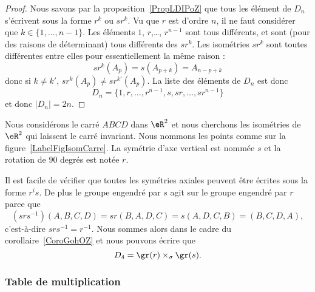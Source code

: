 \begin{proof}
    Nous savons par la proposition~\ref{PropLDIPoZ} que tous les élément de \( D_n\) s'écrivent sous la forme \( r^k\) ou \( sr^k\). Vu que \( r\) est d'ordre \( n\), il ne faut considérer que \( k\in\{ 1,\ldots, n-1 \}\). Les éléments \( 1\), \( r\),\ldots, \( r^{n-1}\) sont tous différents, et sont (pour des raisons de déterminant) tous différents des \( sr^k\). Les isométries \( sr^k\) sont toutes différentes entre elles pour essentiellement la même raison :
    \begin{equation}
        sr^k(A_p)=s(A_{p+k})=A_{n-p+k}
    \end{equation}
    donc si \( k\neq k'\), \( sr^k(A_p)\neq sr^{k'}(A_p)\). La liste des éléments de \( D_n\) est donc
    \begin{equation}
        D_n=\{ 1,r,\ldots, r^{n-1},s,sr,\ldots, sr^{n-1} \}
    \end{equation}
    et donc \( | D_n |=2n\).
\end{proof}

\begin{example}     \label{EXooHNYYooUDsKnm}
    Nous considérons le carré \( ABCD\) dans \( \eR^2\) et nous cherchons les isométries de \( \eR^2\) qui laissent le carré invariant. Nous nommons les points comme sur la figure~\ref{LabelFigIsomCarre}. La symétrie d'axe vertical est nommée \( s\) et la rotation de \( 90\) degrés est notée \( r\).
    \newcommand{\CaptionFigIsomCarre}{Le carré dont nous étudions le groupe diédral.}
    

    Il est facile de vérifier que toutes les symétries axiales peuvent être écrites sous la forme \( r^is\). De plus le groupe engendré par \( s\) agit sur le groupe engendré par \( r\) parce que
    \begin{equation}
        (srs^{-1})(A,B,C,D)=sr(B,A,D,C)=s(A,D,C,B)=(B,C,D,A),
    \end{equation}
    c'est-à-dire \( srs^{-1}=r^{-1}\). Nous sommes alors dans le cadre du corollaire~\ref{CoroGohOZ} et nous pouvons écrire que
    \begin{equation}
        D_4=\gr(r)\times_{\sigma}\gr(s).
    \end{equation}
\end{example}

\subsubsection{Table de multiplication}


